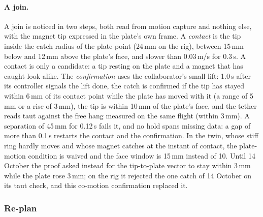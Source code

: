 \paragraph{A join.} A join is noticed in two steps, both read from motion capture and nothing else, with the
magnet tip expressed in the plate's own frame. A \emph{contact} is the tip inside the catch radius of the plate
point (24\,mm on the rig), between 15\,mm below and 12\,mm above the plate's face, and slower than 0.03\,m/s for
0.3\,s. A contact is only a candidate: a tip resting on the plate and a magnet that has caught look alike. The
\emph{confirmation} uses the collaborator's small lift: 1.0\,s after its controller signals the lift done, the catch
is confirmed if the tip has stayed within 6\,mm of its contact point while the plate has moved with it (a range of
5\,mm or a rise of 3\,mm), the tip is within 10\,mm of the plate's face, and the tether reads taut against the free hang measured on the
same flight (within 3\,mm). A separation of 45\,mm for 0.12\,s fails it, and no hold spans missing data: a gap of more than 0.1\,s
restarts the contact and the confirmation. In the twin, whose stiff ring hardly moves and whose magnet catches at the
instant of contact, the plate-motion condition is waived and the face window is 15\,mm instead of 10. Until 14 October the proof
asked instead for the tip-to-plate vector to stay within 3\,mm while the plate rose 3\,mm; on the rig it rejected the
one catch of 14 October on its taut check, and this co-motion confirmation replaced it.

\subsubsection{Re-plan}

